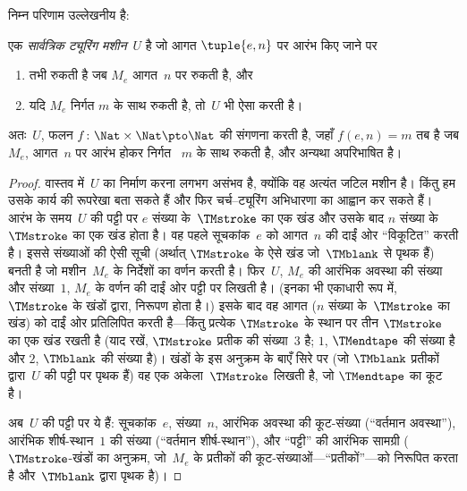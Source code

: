\documentclass[../../../include/open-logic-section]{subfiles}
\begin{document}
निम्न परिणाम उल्लेखनीय है:

\begin{thm} एक \emph{सार्वत्रिक ट्यूरिंग
  मशीन}~$U$ है जो आगत $\tuple{e,n}$ पर आरंभ किए जाने पर
  \begin{enumerate}
    \item तभी रुकती है जब $M_e$ आगत~$n$ पर रुकती है, और
    \item यदि $M_e$ निर्गत $m$ के साथ रुकती है, तो~$U$ भी ऐसा करती है।
  \end{enumerate}
  अतः~$U$, फलन $f\colon \Nat \times \Nat \pto \Nat$ की संगणना करती
  है, जहाँ $f(e,n) = m$ तब है जब $M_e$, आगत~$n$ पर आरंभ होकर निर्गत
  ~$m$ के साथ रुकती है, और अन्यथा अपरिभाषित है।
\end{thm}

\begin{proof}
  वास्तव में~$U$ का निर्माण करना लगभग असंभव है, क्योंकि वह अत्यंत जटिल
  मशीन है। किंतु हम उसके कार्य की रूपरेखा बता सकते हैं और फिर
  चर्च--ट्यूरिंग अभिधारणा का आह्वान कर सकते हैं। आरंभ के समय~$U$ की पट्टी
  पर $e$ संख्या के~$\TMstroke$ का एक खंड और उसके बाद $n$ संख्या के
  ~ $\TMstroke$ का एक खंड होता है। वह पहले सूचकांक~$e$ को आगत~$n$ की
  दाईं ओर “विकूटित” करती है। इससे संख्याओं की ऐसी सूची (अर्थात्
  $\TMstroke$ के ऐसे खंड जो~$\TMblank$ से पृथक हैं) बनती है जो
  मशीन~$M_e$ के निर्देशों का वर्णन करती है। फिर~$U$, $M_e$ की आरंभिक
  अवस्था की संख्या और संख्या~$1$, $M_e$ के वर्णन की दाईं ओर पट्टी पर
  लिखती है। (इनका भी
  एकाधारी रूप में, $\TMstroke$ के खंडों द्वारा, निरूपण होता है।) इसके बाद
  वह आगत ($n$ संख्या के~$\TMstroke$ का खंड) को दाईं ओर प्रतिलिपित करती
  है---किंतु प्रत्येक $\TMstroke$ के स्थान पर तीन $\TMstroke$ का एक खंड
  रखती है (याद रखें, $\TMstroke$ प्रतीक की संख्या~$3$ है; $1$,
  $\TMendtape$ की संख्या है और $2$, $\TMblank$ की संख्या है)। खंडों
  के इस अनुक्रम के बाएँ सिरे पर (जो $\TMblank$ प्रतीकों द्वारा~$U$ की
  पट्टी पर पृथक हैं) वह एक अकेला~$\TMstroke$ लिखती है, जो
  $\TMendtape$ का कूट है।

  अब~$U$ की पट्टी पर ये हैं: सूचकांक~$e$, संख्या~$n$, आरंभिक अवस्था की
  कूट-संख्या (``वर्तमान अवस्था''), आरंभिक शीर्ष-स्थान~$1$ की संख्या
  (``वर्तमान शीर्ष-स्थान''), और ``पट्टी'' की आरंभिक सामग्री
  ($\TMstroke$-खंडों का अनुक्रम, जो~$M_e$ के प्रतीकों की
  कूट-संख्याओं---``प्रतीकों''---को निरूपित करता है और~$\TMblank$ द्वारा
  पृथक है)।


\end{proof}
\end{document}
